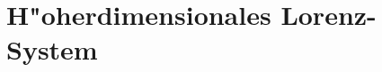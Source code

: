 %
%
%
\chapter{H"oherdimensionales Lorenz-System\label{chapter:lorenz2}}
\begin{refsection}









\printbibliography[heading=subbibliography]
\end{refsection}
